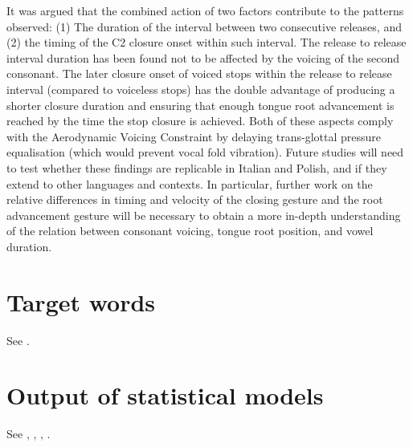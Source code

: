 \documentclass[preprint]{JASAnew}
\begin{document}
It was argued that the combined action of two factors contribute to the
patterns observed: (1) The duration of the interval between two
consecutive releases, and (2) the timing of the C2 closure onset within
such interval. The release to release interval duration has been found
not to be affected by the voicing of the second consonant. The later
closure onset of voiced stops within the release to release interval
(compared to voiceless stops) has the double advantage of producing a
shorter closure duration and ensuring that enough tongue root
advancement is reached by the time the stop closure is achieved. Both of
these aspects comply with the Aerodynamic Voicing Constraint
\citep{ohala2011} by delaying trans-glottal pressure equalisation (which
would prevent vocal fold vibration). Future studies will need to test
whether these findings are replicable in Italian and Polish, and if they
extend to other languages and contexts. In particular, further work on
the relative differences in timing and velocity of the closing gesture
and the root advancement gesture will be necessary to obtain a more
in-depth understanding of the relation between consonant voicing, tongue
root position, and vowel duration.

\appendix

\hypertarget{target-words}{%
\section{Target words}\label{target-words}}

\label{a:targets}

See .


\hypertarget{output-of-statistical-models}{%
\section{Output of statistical
models}\label{output-of-statistical-models}}

See , ,
, .
\end{document}

